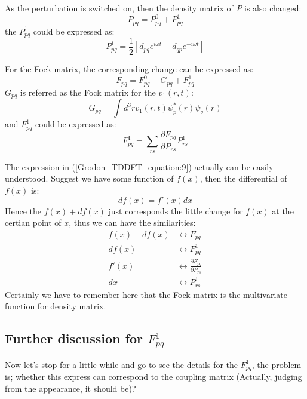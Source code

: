 As the perturbation is switched on, then the density matrix of $P$ is
also changed:
\begin{equation}\label{Grodon_TDDFT_equation:7}
P_{pq} = P^{0}_{pq} + P^{1}_{pq}
\end{equation}
the $P^{1}_{pq}$ could be expressed as:
\begin{equation}\label{Grodon_TDDFT_equation:8}
P^{1}_{pq} = \frac{1}{2}\left[ d_{pq}e^{i\omega t} + d_{qp}e^{-i\omega
t}\right] 
\end{equation}

For the Fock matrix, the corresponding change can be expressed as:
\begin{equation}\label{Grodon_TDDFT_equation:9}
F_{pq} = F^{0}_{pq} + G_{pq} + F^{1}_{pq}
\end{equation}
$G_{pq}$ is referred as the Fock matrix for the $v_{1}(r,t)$:
\begin{equation}
\label{Grodon_TDDFT_equation:10}
G_{pq} = \int d^{3}r v_{1}(r,t)\psi^{*}_{p}(r)\psi_{q}(r)
\end{equation} 
and $F^{1}_{pq}$ could be expressed as:
\begin{equation}\label{Grodon_TDDFT_equation:11}
F^{1}_{pq} = \sum_{rs}\frac{\partial F_{pq}}{\partial
P_{rs}}P^{1}_{rs} 
\end{equation}

The expression in (\ref{Grodon_TDDFT_equation:9}) actually can be
easily understood. Suggest we have some function of $f(x)$, then the
differential of $f(x)$ is:
\begin{equation}
 df(x) = f'(x)dx
\end{equation}
Hence the $f(x) + df(x)$ just corresponds the little change for
$f(x)$ at the certian point of $x$, thus we can have the
similarities:
\begin{align}
 f(x) + df(x) &\leftrightarrow F_{pq} \nonumber \\
        df(x) &\leftrightarrow F^{1}_{pq} \nonumber \\
        f'(x) &\leftrightarrow \frac{\partial F_{pq}}
                                {\partial P_{rs}} \nonumber \\
        dx &\leftrightarrow  P^{1}_{rs}
\end{align}
Certainly we have to remember here that the Fock matrix is the
multivariate function for density matrix.

\subsection{Further discussion for $F^{1}_{pq}$}
%
%
%
%
%
Now let's stop for a little while and go to see the details for the
$F^{1}_{pq}$, the problem is; whether this express can correspond to
the coupling matrix (Actually, judging from the appearance, it
should be)?

